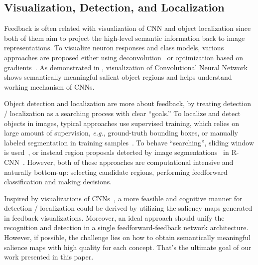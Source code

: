 \subsection{Visualization, Detection, and Localization}

Feedback is often related with visualization of CNN and object localization since both of them aim to project the high-level semantic information back to image representations. To visualize neuron responses and class models, various approaches are proposed either using deconvolution~\cite{zeiler2014visualizing} or optimization based on gradients~\cite{simonyan2013deep, le2013building}. As demonstrated in \cite{simonyan2013deep}, visualization of Convolutional Neural Network shows semantically meaningful salient object regions and helps understand working mechanism of CNNs.

Object detection and localization are more about feedback, by treating detection / localization as a searching process with clear ``goals.'' To localize and detect objects in images, typical approaches use supervised training, which relies on large amount of supervision, \emph{e.g.}, ground-truth bounding boxes, or manually labeled segmentation in training samples~\cite{erhan2014scalable}. To behave ``searching'', sliding window is used~\cite{erhan2014scalable}, or instead region proposals detected by image segmentations~\cite{uijlings2013selective} in R-CNN~\cite{girshick2014rich}. However, both of these approaches are computational intensive and naturally bottom-up: selecting candidate regions, performing feedforward classification and making decisions.

Inspired by visualizations of CNNs~\cite{zeiler2014visualizing,simonyan2013deep}, a more feasible and cognitive manner for detection / localization could be derived by utilizing the saliency maps generated in feedback visualizations. Moreover, an ideal approach should unify the recognition and detection in a single feedforward-feedback network architecture. However, if possible, the challenge lies on how to obtain semantically meaningful salience maps with high quality for each concept. That's the ultimate goal of our work presented in this paper.
